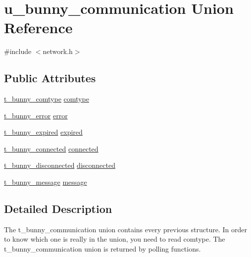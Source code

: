 \hypertarget{unionu__bunny__communication}{\section{u\-\_\-bunny\-\_\-communication Union Reference}
\label{unionu__bunny__communication}
}


{\ttfamily \#include $<$network.\-h$>$}

\subsection*{Public Attributes}
\begin{DoxyCompactItemize}
\item 
\hyperlink{network_8h_ac01621d0080b82d3bebc95c8338b24ce}{t\-\_\-bunny\-\_\-comtype} \hyperlink{unionu__bunny__communication_a187aed42603891c64af9fe9ab3c01bd4}{comtype}
\item 
\hyperlink{network_8h_ac78e4fcb3c2044f557b3bb8e62078eab}{t\-\_\-bunny\-\_\-error} \hyperlink{unionu__bunny__communication_a92628b333aece17e1d676f37cbe22ebd}{error}
\item 
\hyperlink{network_8h_af327a71bccc8f8d86c446a1bf3d78a2b}{t\-\_\-bunny\-\_\-expired} \hyperlink{unionu__bunny__communication_a6cb9d1db3e8cd2e766333782e78b9fe2}{expired}
\item 
\hyperlink{network_8h_aed705485393480b2d1008f924632b613}{t\-\_\-bunny\-\_\-connected} \hyperlink{unionu__bunny__communication_ad88d2cf773bfaa153e2fc24bf19cb873}{connected}
\item 
\hyperlink{network_8h_abd0e42d86a4509a1acfbc111b27ae505}{t\-\_\-bunny\-\_\-disconnected} \hyperlink{unionu__bunny__communication_a091bad47e4ed34fda1b5120e42d0a07c}{disconnected}
\item 
\hyperlink{network_8h_ab76d939939694146c153bc27fca03484}{t\-\_\-bunny\-\_\-message} \hyperlink{unionu__bunny__communication_a1569044b8423108f0ef62be05de944c3}{message}
\end{DoxyCompactItemize}


\subsection{Detailed Description}
The t\-\_\-bunny\-\_\-communication union contains every previous structure. In order to know which one is really in the union, you need to read comtype. The t\-\_\-bunny\-\_\-communication union is returned by polling functions. 

